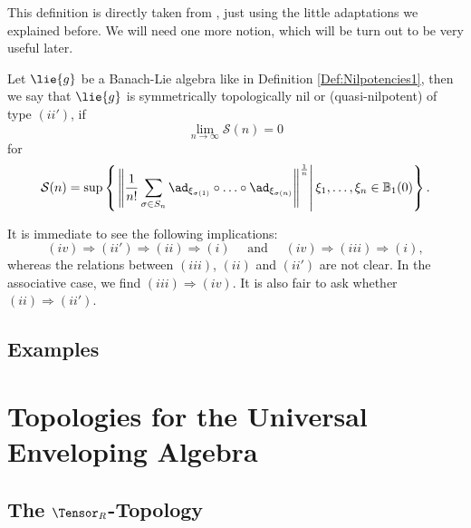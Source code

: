 \documentclass[
11pt,                          %
english                        %
]{article}
\begin{document}
This definition is directly taken from \cite{muller}, just using the little adaptations we explained before. We will need one more notion, which will be 
turn out to be very useful later.
\begin{definition}
	\label{Def:Nilpotencies2}
	Let $\lie{g}$ be a Banach-Lie algebra like in Definition 
	\ref{Def:Nilpotencies1}, then we say that $\lie{g}$ is symmetrically
	topologically nil or (quasi-nilpotent) of type $(ii')$, if
	\begin{equation*}
		\lim_{n \longrightarrow \infty}
		\mathcal{S}(n)
		=
		0
	\end{equation*}
	for
	\begin{equation}
		\mathcal{S}(n)
		=
		\sup \left\{ 
		\left.
			\left\Vert
				\frac{1}{n!}
				\sum\limits_{\sigma \in S_n}
				\ad_{\xi_{\sigma(1)}} \circ \ldots \circ \ad_{\xi_{\sigma(n)}}
			\right\Vert^{\frac{1}{n}} 
		\right|
			\xi_1, \ldots, \xi_n \in \mathbb{B}_1(0)
		\right\}.
	\end{equation}
\end{definition}
It is immediate to see the following implications:
\begin{equation*}
	(iv) \Longrightarrow 
	(ii') \Longrightarrow 
	(ii) \Longrightarrow 
	(i)
	\quad \text{ and } \quad
	(iv) \Longrightarrow
	(iii) \Longrightarrow 
	(i),
\end{equation*}
whereas the relations between $(iii)$, $(ii)$ and $(ii')$ are not clear. In the 
associative case, we find $(iii) \Longrightarrow (iv)$. It is also fair to ask 
whether $(ii) \Longrightarrow (ii')$.

\subsection{Examples}


\section{Topologies for the Universal Enveloping Algebra}
\label{sec:Topologies}

\subsection{The $\Tensor_R$-Topology}
\end{document}
